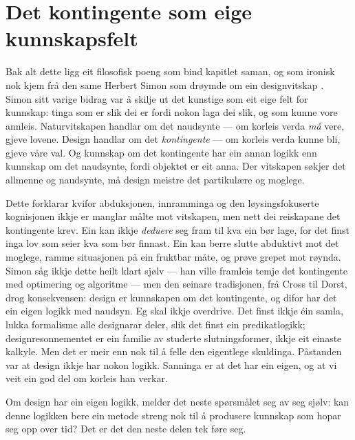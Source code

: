 \section{Det kontingente som eige kunnskapsfelt}

Bak alt dette ligg eit filosofisk poeng som bind kapitlet saman, og som ironisk nok kjem frå den same Herbert Simon som drøymde om ein designvitskap \autocite{simon1969sciences}. Simon sitt varige bidrag var å skilje ut det kunstige som eit eige felt for kunnskap: tinga som er slik dei er fordi nokon laga dei slik, og som kunne vore annleis. Naturvitskapen handlar om det naudsynte — om korleis verda \emph{må} vere, gjeve lovene. Design handlar om det \emph{kontingente} — om korleis verda kunne bli, gjeve våre val. Og kunnskap om det kontingente har ein annan logikk enn kunnskap om det naudsynte, fordi objektet er eit anna. Der vitskapen søkjer det allmenne og naudsynte, må design meistre det partikulære og moglege.

Dette forklarar kvifor abduksjonen, innramminga og den løysingsfokuserte kognisjonen ikkje er manglar målte mot vitskapen, men nett dei reiskapane det kontingente krev. Ein kan ikkje \emph{deduere} seg fram til kva ein bør lage, for det finst inga lov som seier kva som bør finnast. Ein kan berre slutte abduktivt mot det moglege, ramme situasjonen på ein fruktbar måte, og prøve grepet mot røynda. Simon såg ikkje dette heilt klart sjølv — han ville framleis temje det kontingente med optimering og algoritme — men den seinare tradisjonen, frå Cross til Dorst, drog konsekvensen: design er kunnskapen om det kontingente, og difor har det ein eigen logikk med naudsyn. Eg skal ikkje overdrive. Det finst ikkje éin samla, lukka formalisme alle designarar deler, slik det finst ein predikatlogikk; designresonnementet er ein familie av studerte slutningsformer, ikkje eit einaste kalkyle. Men det er meir enn nok til å felle den eigentlege skuldinga. Påstanden var at design ikkje har nokon logikk. Sanninga er at det har ein eigen, og at vi veit ein god del om korleis han verkar.

\vignett

Om design har ein eigen logikk, melder det neste spørsmålet seg av seg sjølv: kan denne logikken bere ein metode streng nok til å produsere kunnskap som hopar seg opp over tid? Det er det den neste delen tek føre seg.

